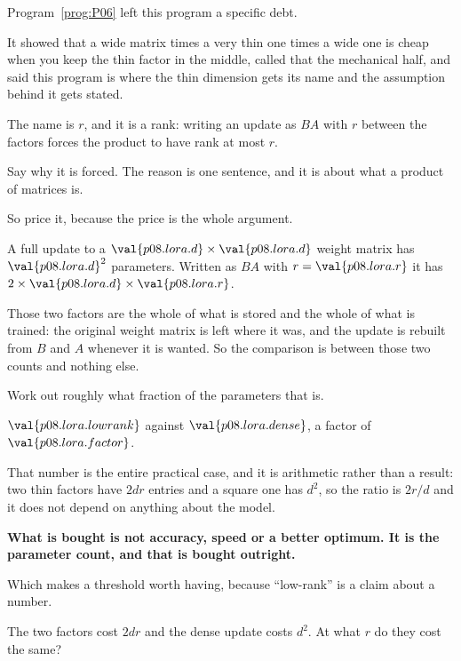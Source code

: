 \begin{fr}
Program~\ref{prog:P06} left this program a specific debt.

It showed that a wide matrix times a very thin one times a wide one is cheap
when you keep the thin factor in the middle, called that the mechanical half,
and said this program is where the thin dimension gets its name and the
assumption behind it gets stated.

The name is $r$, and it is a rank: writing an update as $BA$ with $r$ between
the factors forces the product to have rank at most $r$.

Say why it is forced. The reason is one sentence, and it is about what a
product of matrices is.
\dotline
\nextframe
\end{fr}

\begin{fr}
So price it, because the price is the whole argument.

A full update to a $\val{p08.lora.d} \times \val{p08.lora.d}$ weight matrix has
$\val{p08.lora.d}^{2}$ parameters. Written as $BA$ with $r =
\val{p08.lora.r}$ it has $2 \times \val{p08.lora.d} \times \val{p08.lora.r}$.

Those two factors are the whole of what is stored and the whole of what is
trained: the original weight matrix is left where it was, and the update is
rebuilt from $B$ and $A$ whenever it is wanted. So the comparison is between
those two counts and nothing else.

Work out roughly what fraction of the parameters that is.
\dotline
\nextframe
\end{fr}

\begin{fr}
$\val{p08.lora.lowrank}$ against $\val{p08.lora.dense}$, a factor of
$\val{p08.lora.factor}$.

That number is the entire practical case, and it is arithmetic rather than a
result: two thin factors have $2dr$ entries and a square one has $d^{2}$, so
the ratio is $2r/d$ and it does not depend on anything about the model.

\textbf{What is bought is not accuracy, speed or a better optimum. It is the
parameter count, and that is bought outright.}
\end{fr}

\begin{fr}
Which makes a threshold worth having, because \enquote{low-rank}%
 is a claim about a number.

The two factors cost $2dr$ and the dense update costs $d^{2}$. At what $r$ do
they cost the same?
\dotline
\nextframe
\end{fr}

